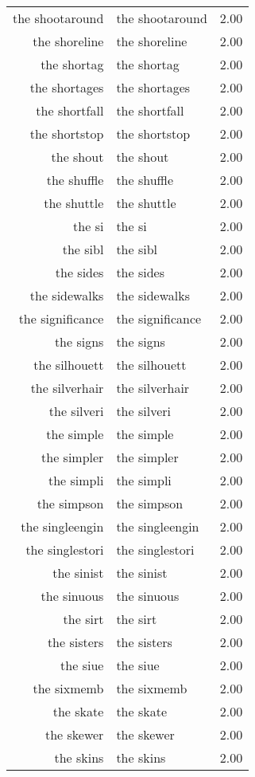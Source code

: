 \begin{table}[ht]
\begin{tabular}{rlr}
  the shootaround & the shootaround & 2.00 \\ 
  the shoreline & the shoreline & 2.00 \\ 
  the shortag & the shortag & 2.00 \\ 
  the shortages & the shortages & 2.00 \\ 
  the shortfall & the shortfall & 2.00 \\ 
  the shortstop & the shortstop & 2.00 \\ 
  the shout & the shout & 2.00 \\ 
  the shuffle & the shuffle & 2.00 \\ 
  the shuttle & the shuttle & 2.00 \\ 
  the si & the si & 2.00 \\ 
  the sibl & the sibl & 2.00 \\ 
  the sides & the sides & 2.00 \\ 
  the sidewalks & the sidewalks & 2.00 \\ 
  the significance & the significance & 2.00 \\ 
  the signs & the signs & 2.00 \\ 
  the silhouett & the silhouett & 2.00 \\ 
  the silverhair & the silverhair & 2.00 \\ 
  the silveri & the silveri & 2.00 \\ 
  the simple & the simple & 2.00 \\ 
  the simpler & the simpler & 2.00 \\ 
  the simpli & the simpli & 2.00 \\ 
  the simpson & the simpson & 2.00 \\ 
  the singleengin & the singleengin & 2.00 \\ 
  the singlestori & the singlestori & 2.00 \\ 
  the sinist & the sinist & 2.00 \\ 
  the sinuous & the sinuous & 2.00 \\ 
  the sirt & the sirt & 2.00 \\ 
  the sisters & the sisters & 2.00 \\ 
  the siue & the siue & 2.00 \\ 
  the sixmemb & the sixmemb & 2.00 \\ 
  the skate & the skate & 2.00 \\ 
  the skewer & the skewer & 2.00 \\ 
  the skins & the skins & 2.00 \\ 

\end{tabular}
\end{table}
